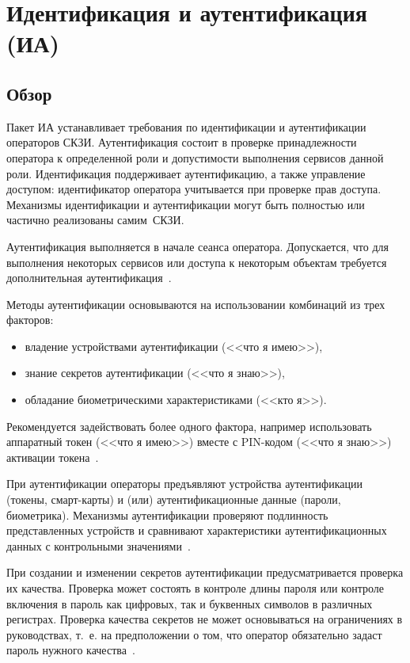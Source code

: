 \section{Идентификация и аутентификация (ИА)}\label{IA}

\subsection{Обзор}\label{IA.Intro}

Пакет ИА устанавливает требования по идентификации и аутентификации операторов 
СКЗИ. Аутентификация состоит в проверке принадлежности оператора к определенной 
роли и допустимости выполнения сервисов данной роли. Идентификация поддерживает 
аутентификацию, а также управление доступом: идентификатор оператора 
учитывается при проверке прав доступа.
%
Механизмы идентификации и аутентификации могут быть полностью или частично
реализованы самим~СКЗИ.

Аутентификация выполняется в начале сеанса оператора. Допускается, что для
выполнения некоторых сервисов или доступа к некоторым объектам требуется
дополнительная аутентификация~.

Методы аутентификации основываются на использовании комбинаций из трех факторов:
\begin{itemize}
\item
владение устройствами аутентификации (<<что я имею>>), 
\item
знание секретов аутентификации (<<что я знаю>>), 
\item
обладание биометрическими характеристиками (<<кто я>>).
\end{itemize}

Рекомендуется задействовать более одного фактора, например использовать 
аппаратный токен (<<что я имею>>) вместе с PIN-кодом (<<что я знаю>>) 
активации токена~.

При аутентификации операторы предъявляют устройства аутентификации 
(токены, смарт-карты) и (или) аутентификационные данные (пароли, биометрика).
%
Механизмы аутентификации проверяют подлинность представленных устройств и
сравнивают характеристики аутентификационных данных с контрольными
значениями~.

При создании и изменении секретов аутентификации предусматривается проверка их
качества. Проверка может состоять в контроле длины пароля или контроле включения
в пароль как цифровых, так и буквенных символов в различных регистрах. Проверка
качества секретов не может основываться на ограничениях в руководствах, т.~е. на
предположении о том, что оператор обязательно задаст пароль нужного
качества~.

